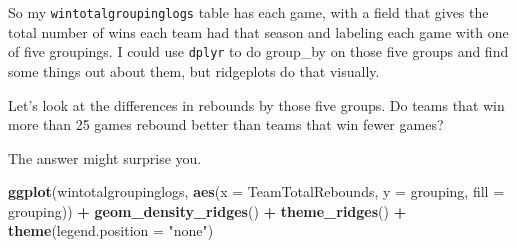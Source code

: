 \documentclass[]{book}
\newenvironment{Shaded}{\begin{snugshade}}{\end{snugshade}}
\newcommand{\KeywordTok}[1]{\textcolor[rgb]{0.13,0.29,0.53}{\textbf{#1}}}
\newcommand{\DataTypeTok}[1]{\textcolor[rgb]{0.13,0.29,0.53}{#1}}
\newcommand{\DecValTok}[1]{\textcolor[rgb]{0.00,0.00,0.81}{#1}}
\newcommand{\StringTok}[1]{\textcolor[rgb]{0.31,0.60,0.02}{#1}}
\newcommand{\OperatorTok}[1]{\textcolor[rgb]{0.81,0.36,0.00}{\textbf{#1}}}
\newcommand{\NormalTok}[1]{#1}
\begin{document}
\begin{Shaded}
\end{Shaded}

So my \texttt{wintotalgroupinglogs} table has each game, with a field
that gives the total number of wins each team had that season and
labeling each game with one of five groupings. I could use
\texttt{dplyr} to do group\_by on those five groups and find some things
out about them, but ridgeplots do that visually.

Let's look at the differences in rebounds by those five groups. Do teams
that win more than 25 games rebound better than teams that win fewer
games?

The answer might surprise you.

\begin{Shaded}
\begin{Highlighting}[]
\KeywordTok{ggplot}\NormalTok{(wintotalgroupinglogs, }\KeywordTok{aes}\NormalTok{(}\DataTypeTok{x =}\NormalTok{ TeamTotalRebounds, }\DataTypeTok{y =}\NormalTok{ grouping, }\DataTypeTok{fill =}\NormalTok{ grouping)) }\OperatorTok{+}
\StringTok{  }\KeywordTok{geom_density_ridges}\NormalTok{() }\OperatorTok{+}
\StringTok{  }\KeywordTok{theme_ridges}\NormalTok{() }\OperatorTok{+}\StringTok{ }
\StringTok{  }\KeywordTok{theme}\NormalTok{(}\DataTypeTok{legend.position =} \StringTok{"none"}\NormalTok{)}
\end{Highlighting}
\end{Shaded}
\end{document}
